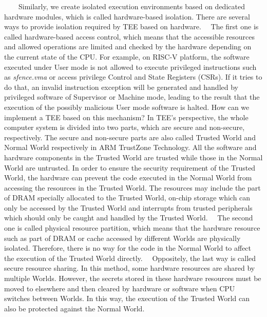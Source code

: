 \documentclass[12pt,twoside]{report}
\begin{document}
\ \ \ \ Similarly, we create isolated execution environments based on dedicated hardware modules, which is called hardware-based isolation. There are several ways to provide isolation required by TEE based on hardware. \ \ The first one is called hardware-based access control, which means that the accessible resources and allowed operations are limited and checked by the hardware depending on the current state of the CPU. For example, on RISC-V platform\cite{riscv-privileged-spec}, the software executed under User mode is not allowed to execute privileged instructions such as \textit{sfence.vma} or access privilege Control and State Registers (CSRs). If it tries to do that, an invalid instruction exception will be generated and handled by privileged software of Supervisor or Machine mode, leading to the result that the execution of the possibly malicious User mode software is halted. How can we implement a TEE based on this mechanism? In TEE's perspective, the whole computer system is divided into two parts, which are secure and non-secure, respectively. The secure and non-secure parts are also called Trusted World and Normal World respectively in ARM TrustZone Technology\cite{trustzone-intro}. All the software and hardware components in the Trusted World are trusted while those in the Normal World are untrusted. In order to ensure the security requirement of the Trusted World, the hardware can prevent the code executed in the Normal World from accessing the resources in the Trusted World. The resources may include the part of DRAM specially allocated to the Trusted World, on-chip storage which can only be accessed by the Trusted World and interrupts from trusted peripherals which should only be caught and handled by the Trusted World. \ \ The second one is called physical resource partition, which means that the hardware resource such as part of DRAM or cache accessed by different Worlds are physically isolated. Therefore, there is no way for the code in the Normal World to affect the execution of the Trusted World directly. \ \ Oppositely, the last way is called secure resource sharing. In this method, some hardware resources are shared by multiple Worlds. However, the secrets stored in these hardware resources must be moved to elsewhere and then cleared by hardware or software when CPU switches between Worlds. In this way, the execution of the Trusted World can also be protected against the Normal World.
\end{document}

